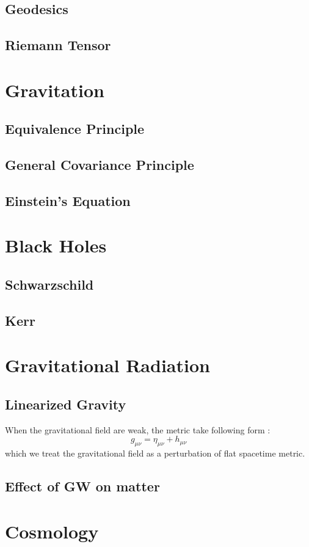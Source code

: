 \documentclass[12pt]{article}
\theoremstyle{mystyle}{\newtheorem{definition}{Definition}[section]}
\theoremstyle{mystyle}{\newtheorem{theorem}[definition]{Theorem}}
\theoremstyle{mystyle}{\newtheorem*{remark}{Remark}}
\theoremstyle{mystyle}{\newtheorem*{example}{Example}}
\theoremstyle{mystyle}{\newtheorem*{examples}{Examples}}
\theoremstyle{cstyle}{\newtheorem*{cthm}{}}
\begin{document}
\subsection{Geodesics}
\subsection{Riemann Tensor}

\section{Gravitation}
\subsection{Equivalence Principle}
\subsection{General Covariance Principle}
\subsection{Einstein's Equation}

\section{Black Holes}
\subsection{Schwarzschild}
\subsection{Kerr}

\section{Gravitational Radiation}
\subsection{Linearized Gravity}
When the gravitational field are weak, the metric take following form :\[g_{\mu\nu} = \eta_{\mu\nu} + h_{\mu\nu} \]
which we treat the gravitational field as a perturbation of flat spacetime metric.
\subsection{Effect of GW on matter}
\section{Cosmology}
\end{document}
